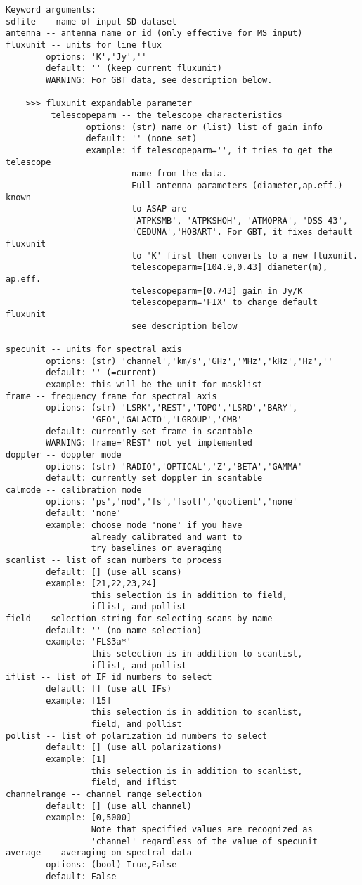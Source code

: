 \begin{verbatim}
Keyword arguments:
sdfile -- name of input SD dataset
antenna -- antenna name or id (only effective for MS input)
fluxunit -- units for line flux
        options: 'K','Jy',''
        default: '' (keep current fluxunit)
        WARNING: For GBT data, see description below.
        
    >>> fluxunit expandable parameter
         telescopeparm -- the telescope characteristics
                options: (str) name or (list) list of gain info
                default: '' (none set)
                example: if telescopeparm='', it tries to get the telescope
                         name from the data.
                         Full antenna parameters (diameter,ap.eff.) known
                         to ASAP are
                         'ATPKSMB', 'ATPKSHOH', 'ATMOPRA', 'DSS-43',
                         'CEDUNA','HOBART'. For GBT, it fixes default fluxunit
                         to 'K' first then converts to a new fluxunit.
                         telescopeparm=[104.9,0.43] diameter(m), ap.eff.
                         telescopeparm=[0.743] gain in Jy/K
                         telescopeparm='FIX' to change default fluxunit
                         see description below

specunit -- units for spectral axis
        options: (str) 'channel','km/s','GHz','MHz','kHz','Hz',''
        default: '' (=current)
        example: this will be the unit for masklist
frame -- frequency frame for spectral axis
        options: (str) 'LSRK','REST','TOPO','LSRD','BARY',
                 'GEO','GALACTO','LGROUP','CMB'
        default: currently set frame in scantable
        WARNING: frame='REST' not yet implemented
doppler -- doppler mode
        options: (str) 'RADIO','OPTICAL','Z','BETA','GAMMA'
        default: currently set doppler in scantable
calmode -- calibration mode
        options: 'ps','nod','fs','fsotf','quotient','none'
        default: 'none'
        example: choose mode 'none' if you have
                 already calibrated and want to
                 try baselines or averaging
scanlist -- list of scan numbers to process
        default: [] (use all scans)
        example: [21,22,23,24]
                 this selection is in addition to field,
                 iflist, and pollist
field -- selection string for selecting scans by name
        default: '' (no name selection)
        example: 'FLS3a*'
                 this selection is in addition to scanlist,
                 iflist, and pollist
iflist -- list of IF id numbers to select
        default: [] (use all IFs)
        example: [15]
                 this selection is in addition to scanlist,
                 field, and pollist
pollist -- list of polarization id numbers to select
        default: [] (use all polarizations)
        example: [1]
                 this selection is in addition to scanlist,
                 field, and iflist
channelrange -- channel range selection
        default: [] (use all channel)
        example: [0,5000]
                 Note that specified values are recognized as 
                 'channel' regardless of the value of specunit 
average -- averaging on spectral data 
        options: (bool) True,False
        default: False


\end{verbatim}

